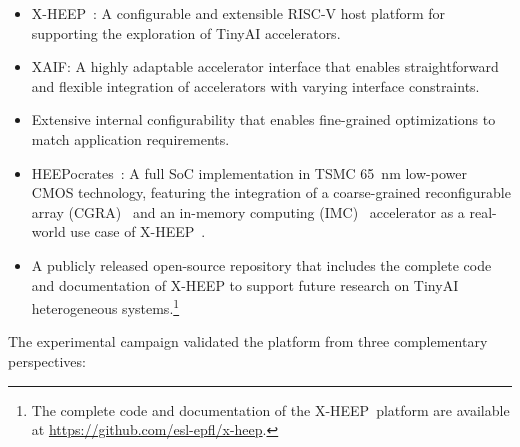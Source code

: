             \vspace{-1em}
            \begin{itemize}
                \item \mbox{X-HEEP}~\cite{x-heep}: A configurable and extensible RISC-V host platform for supporting the exploration of TinyAI accelerators.
        
                \item \mbox{XAIF}: A highly adaptable accelerator interface that enables straightforward and flexible integration of accelerators with varying interface constraints.

                \item Extensive internal configurability that enables fine-grained optimizations to match application requirements.
        
                \item \mbox{HEEPocrates}~\cite{heepocrates}: A full SoC implementation in TSMC \SI{65}{\nano\meter} low-power CMOS technology, featuring the integration of a coarse-grained reconfigurable array (CGRA)~\cite{oe-cgra} and an in-memory computing (IMC)~\cite{nmc} accelerator as a real-world use case of \mbox{X-HEEP}~\cite{x-heep}.
        
                \item A publicly released open-source repository that includes the complete code and documentation of \mbox{X-HEEP} to support future research on TinyAI heterogeneous systems.\footnote{The complete code and documentation of the \mbox{X-HEEP platform} are available at \url{https://github.com/esl-epfl/x-heep}.}
            \end{itemize}
            \vspace{-1em}

            The experimental campaign validated the platform from three complementary perspectives:
    
